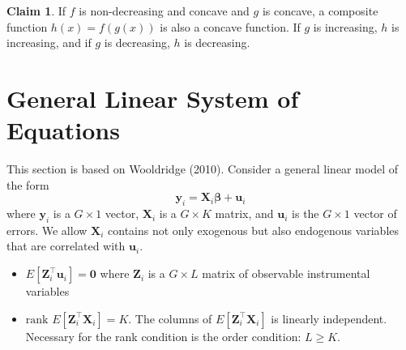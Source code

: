 \documentclass[11pt]{article}
\numberwithin{figure}{section}
\theoremstyle{definition}
\newcommand{\0}{\mathbf{0}}
\newcommand{\rank}{\text{rank }}
\newcommand{\bmX}{\bm{X}}
\newcommand{\bmZ}{\bm{Z}}
\newcommand{\bmu}{\bm{u}}
\newcommand{\bmy}{\bm{y}}
\newtheorem{claim}{Claim}
\begin{document}
    
    
    
    
\begin{claim}
    If $f$ is non-decreasing and concave and $g$ is concave, a composite function $h(x) = f(g(x))$ is also a concave function. If $g$ is increasing, $h$ is increasing, and if $g$ is decreasing, $h$ is decreasing.
\end{claim}
    
    

\section{General Linear System of Equations}
This section is based on Wooldridge (2010).
Consider a general linear model of the form 
\[\bmy_i = \bmX_i \bm{\beta} + \bmu_i\]
where $\bmy_i$ is a $G\times 1$ vector, $\bmX_i$ is a $G\times K$ matrix, and $\bmu_i$ is the $G\times 1$ vector of errors.
We allow $\bmX_i$ contains not only exogenous but also endogenous variables that are correlated with $\bmu_i$.

\begin{itemize}
    \item $E[\bmZ_i^\top \bmu_i] = \bm0$ where $\bmZ_i$ is a $G\times L$ matrix of observable instrumental variables
    \item $\rank E[\bmZ_i^\top \bmX_i] = K$. The columns of $ E[\bmZ_i^\top \bmX_i]$ is linearly independent. Necessary for the rank condition is the order condition: $L\ge K$.
\end{itemize}
  
\end{document}
